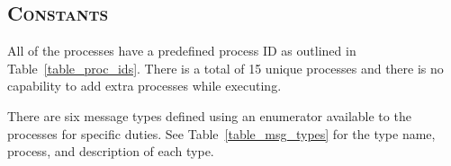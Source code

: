 \documentclass[oneside]{report}
\begin{document}
\subsection{\textsc{Constants}}
\label{sec:global_constants}
All of the processes have a predefined process ID as outlined in
Table~\ref{table_proc_ids}. There is a total of 15 unique processes and there
is no capability to add extra processes while executing. 

\begin{table}[H]
    \caption{Process IDs}    
    \label{table_proc_ids}
\end{table}

There are six message types defined using an enumerator available to the
processes for specific duties. See Table~\ref{table_msg_types} for the type
name, process, and description of each type.
\end{document}
